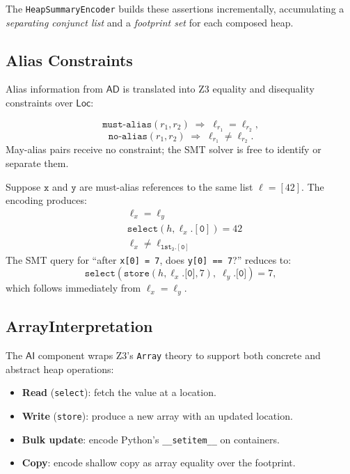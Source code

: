 \documentclass[11pt]{article}
\newcommand{\Loc}{\ell}                     %
\newcommand{\MustAlias}{\ensuremath{\mathtt{must\text{-}alias}}} %
\newcommand{\NoAlias}{\ensuremath{\mathtt{no\text{-}alias}}}     %
\newcommand{\AD}{\mathsf{AD}}               %
\newcommand{\AI}{\mathsf{AI}}               %
\newcommand{\LocSort}{\mathsf{Loc}}         %
\begin{document}
The \texttt{HeapSummaryEncoder} builds these assertions incrementally,
accumulating a \emph{separating conjunct list} and a \emph{footprint
set} for each composed heap.

\subsection{Alias Constraints}

Alias information from $\AD$ is translated into Z3 equality and
disequality constraints over $\LocSort$:

\[
  \MustAlias(r_1,r_2) \;\Rightarrow\; \Loc_{r_1} = \Loc_{r_2},
\]
\[
  \NoAlias(r_1,r_2) \;\Rightarrow\; \Loc_{r_1} \neq \Loc_{r_2}.
\]
May-alias pairs receive no constraint; the SMT solver is free to
identify or separate them.

\begin{example}
  \label{ex:shared-list}
  Suppose $\mathtt{x}$ and $\mathtt{y}$ are must-alias references to the
  same list $\ell = [42]$.  The encoding produces:
  \begin{align*}
    &\Loc_x = \Loc_y \tag{must-alias constraint}\\
    &\mathtt{select}(h, \Loc_x.\mathtt{[0]}) = 42 \tag{field value}\\
    &\Loc_x \neq \Loc_{\mathtt{lst_2}.\mathtt{[0]}} \tag{no-alias with distinct list}
  \end{align*}
  The SMT query for ``after \texttt{x[0] = 7}, does \texttt{y[0] == 7}?''
  reduces to:
  \[
    \mathtt{select}(\mathtt{store}(h, \Loc_x.\texttt{[0]}, 7),\;
      \Loc_y.\texttt{[0]}) = 7,
  \]
  which follows immediately from $\Loc_x = \Loc_y$.
\end{example}

\subsection{ArrayInterpretation}

The $\AI$ component wraps Z3's \texttt{Array} theory to support both
concrete and abstract heap operations:

\begin{itemize}[noitemsep]
  \item \textbf{Read} (\texttt{select}): fetch the value at a location.
  \item \textbf{Write} (\texttt{store}): produce a new array with an
    updated location.
  \item \textbf{Bulk update}: encode Python's \texttt{\_\_setitem\_\_}
    on containers.
  \item \textbf{Copy}: encode shallow copy as array equality over the
    footprint.
\end{itemize}
\end{document}
